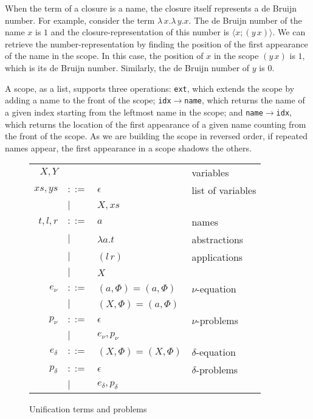 \documentclass[a4paper,UKenglish]{lipics-v2016}
\newcommand{\clos}[2] {
  \langle #1; #2 \rangle
}
\newcommand{\app}[2] {
  (#1\, #2)
}
\begin{document}
When the term of a closure is a name, the closure itself represents a
de Bruijn number.  For example, consider the term
$\lambda\,x.\lambda\,y.x$. The de Bruijn number of the name $x$ is $1$
and the closure-representation of this number is $\clos{x}{(y\,x)}$.
We can retrieve the number-representation by finding the position of
the first appearance of the name in the scope. In this case, the
position of $x$ in the scope $(y\,x)$ is $1$, which is its de Bruijn
number. Similarly, the de Bruijn number of $y$ is $0$.

A scope, as a list, supports three operations: \texttt{ext},
which extends the scope by adding a name to the front of the scope;
\texttt{idx$\rightarrow$name}, which returns the name of a given index
starting from the leftmost name in the scope; and
\texttt{name$\rightarrow$idx}, which returns the location of the first
appearance of a given name counting from the front of the scope.  As we
are building the scope in reversed order, if repeated names appear, the
first appearance in a scope shadows the others.

\begin{wrapfigure}{r}{0.5\textwidth}
  \caption{Unification terms and problems\label{table:new-terms}}
    \begin{tabular}{r l l l}  
    $X,Y$   &       &     & variables \\
      $xs,ys$ & $::=$ & $\epsilon$& list of variables \\
      & $|$&  $X,xs$ &  \\
    $t,l,r$ & $::=$ & $a$ & names \\
    & $|$ & $\lambda a.t$ & abstractions \\
    & $|$ & $\app{l}{r}$ & applications \\
      & $|$ & $X$ & \\
      $e_\nu$  & $::=$ & $(a,\Phi) = (a,\Phi)$ & $\nu$-equation \\
           & $|$ &  $(X,\Phi) = (a,\Phi)$ \\
      $p_\nu$  & $::=$ & $\epsilon$ & $\nu$-problems \\
           & $|$ & $e_\nu, p_\nu$ \\
      $e_\delta$  & $::=$& $(X,\Phi) = (X,\Phi)$ & $\delta$-equation \\
      $p_\delta$  & $::=$ & $\epsilon$ & $\delta$-problems \\
           & $|$ & $e_\delta, p_\delta$
    \end{tabular}
\end{wrapfigure}
\end{document}
